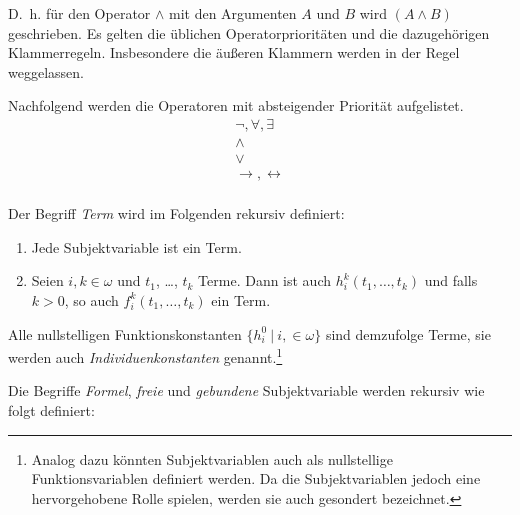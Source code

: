\documentclass[a4paper,german,10pt,twoside]{book}
\theoremstyle{definition}
\theoremstyle{remark}
\begin{document}
D.~h. f{\"u}r den Operator $\land$ mit den Argumenten $A$ und $B$ wird $(A \land B)$ geschrieben. 
Es gelten die {\"u}blichen Operatorpriorit{\"a}ten und die dazugeh{\"o}rigen Klammerregeln. Insbesondere die {\"a}u{\ss}eren Klammern werden in der Regel weggelassen.

\par
Nachfolgend werden die Operatoren mit absteigender Priorit{\"a}t aufgelistet.
$$
\begin{array}{c}
  \neg, \forall, \exists  \\
  \land \\
  \lor \\
  \rightarrow, \leftrightarrow \\
\end{array}
$$

\par
Der Begriff \emph{Term} wird im Folgenden rekursiv definiert:

\begin{enumerate}
\item Jede Subjektvariable ist ein Term. \item Seien $i, k \in \omega$ und $t_1$, \ldots, $t_k$ Terme. Dann ist auch $h^k_i(t_1, \ldots, t_k)$ und falls $k > 0$, so auch $f^k_i(t_1, \ldots, t_k)$ ein Term.
\end{enumerate}

Alle nullstelligen Funktionskonstanten $\{h^0_i~|~i, \in \omega\}$ sind demzufolge Terme, sie werden auch 
\emph{Individuenkonstanten} genannt.\footnote{Analog dazu k{\"o}nnten Subjektvariablen auch als nullstellige Funktionsvariablen definiert werden. Da die Subjektvariablen jedoch eine hervorgehobene Rolle spielen, werden sie auch gesondert bezeichnet.}

\par
Die Begriffe \emph{Formel}, \emph{freie} und 
\emph{gebundene} Subjektvariable werden rekursiv wie folgt definiert:
\end{document}
